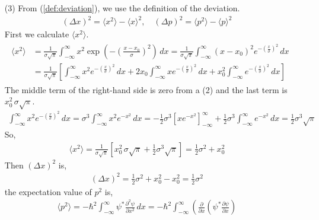\documentclass[floatfix,nofootinbib,superscriptaddress,fleqn]{revtex4-2}
\begin{document}
\begin{itemize}
\item[(3)] From (\ref{def:deviation}), we use the definition of the deviation.
  \begin{align}
    {(\Delta x)}^2 = \langle x^2\rangle 
    - \langle x\rangle^2 ,\quad {(\Delta p)}^2 
    = \langle p^2\rangle - \langle p\rangle^2 
  \end{align}
First we calculate $\langle x^2\rangle$.
  \begin{align*}
    \begin{split}
      \langle x^2\rangle 
      &= \frac{1}{\sigma\sqrt{\pi}}\int_{-\infty}^{\infty} x^2 
      \exp\left(-{\left( \frac{x-x_0}{\sigma}\right)}^2\right)\,dx 
      = \frac{1}{\sigma\sqrt{\pi}}\int_{-\infty}^{\infty}(x-x_0)^2 
      e^{-{\left( \frac{x}{\sigma}\right)}^2}\,dx 
      \\
      &= \frac{1}{\sigma\sqrt{\pi}}\left[\int_{-\infty}^{\infty} x^2 
      e^{-{\left( \frac{x}{\sigma} \right)}^2}\,dx
      +2x_0\int_{-\infty}^{\infty}xe^{-{\left(
      \frac{x}{\sigma}\right)}^2}\,dx
      +x^2_0\int_{-\infty}^{\infty}e^{-{\left(
      \frac{x}{\sigma}\right)}^2}\,dx\right]
      \end{split}
  \end{align*}
The middle term of the right-hand side is zero from a (2) 
and the last term is $x^2_0\,\sigma\sqrt{\pi}$.
  \begin{align*}
    \int_{-\infty}^{\infty} x^2 e^{-{\left(
      \frac{x}{\sigma}\right)}^2}\,dx 
    =\sigma^3\int_{-\infty}^{\infty} x^2e^{-x^2}\,dx 
    =-\frac{1}{2}\sigma^3{\left[xe^{-x^2}\right]}^{\infty}_{-\infty}
    +\frac{1}{2}\sigma^3\int_{-\infty}^{\infty} 
    e^{-x^2}\,dx
    =\frac{1}{2}\sigma^3\sqrt{\pi}
  \end{align*}
So,
  \begin{align*}
    \langle x^2 \rangle = \frac{1}{\sigma\sqrt{\pi}}
    \left[x^2_0\,\sigma\sqrt{\pi}
    +\frac{1}{2}\sigma^3\sqrt{\pi}\right]
   =\frac{1}{2}\sigma^2+x_0^2
  \end{align*}
Then $\left(\Delta x\right)^2$ is,
  \begin{align}
    \left(\Delta x\right)^2 = \frac{1}{2}\sigma^2+x_0^2 
    - x_0^2 = \frac{1}{2}\sigma^2
  \end{align}
the expectation value of $p^2$ is,
  \begin{align*}
    \langle p^2 \rangle = -\hbar^2 \int_{-\infty}^{\infty} \psi^* 
    \frac{\partial^2 \psi}{\partial x^2}\,dx 
    = -\hbar^2\int_{-\infty}^{\infty} \left(\frac{\partial}{\partial x} 
    \left(\psi^*\frac{\partial \psi}{\partial x}\right) 

\end{align*}
\end{itemize}
\end{document}
